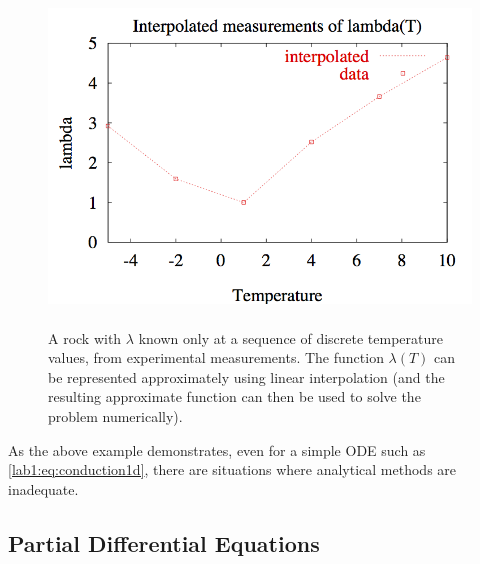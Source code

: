 \begin{example}
\begin{figure}[htbp]
    \centerline{\includegraphics[height=3.5in]{table/table-interp}}
    \caption{A rock with $\lambda$ known only at a sequence of
      discrete temperature values, from experimental measurements.
      The function $\lambda(T)$  can be 
      represented approximately using linear interpolation (and the
      resulting approximate function can then be used to solve the
      problem numerically).}
    \label{lab1:fig:table}
  \end{figure}
\end{example}

As the above example demonstrates, even for a simple ODE such as
\eqref{lab1:eq:conduction1d}, there 
are situations where analytical methods are inadequate.  

\subsection{Partial Differential Equations}

